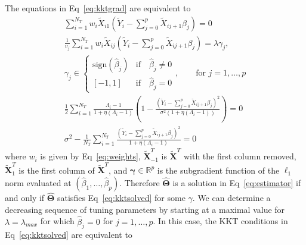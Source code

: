\documentclass[10pt,letterpaper]{article}
\newcommand{\tm}[1]{\textrm{{#1}}}
\newcommand{\bX}{\textbf{X}}
\newcommand{\bXtilde}{\widetilde{\bX}}
\newcommand{\Xtilde}{\widetilde{X}}
\newcommand{\Ytilde}{\widetilde{Y}}
\newcommand{\bTheta}{\boldsymbol{\Theta}}
\begin{document}
The equations in Eq~\ref{eq:kktgrad} are equivalent to
\begin{equation}
\begin{aligned}
\sum_{i=1}^{N_T}w_i \Xtilde_{i1}\left(  \Ytilde_i - \sum_{j=0}^{p}\Xtilde_{ij+1}\beta_j \right)  = 0\\
\frac{1}{v_j} \sum_{i=1}^{N_T}w_i \Xtilde_{ij}\left(  \Ytilde_i - \sum_{j=0}^{p}\Xtilde_{ij+1}\beta_j \right) =  \lambda \gamma_j, \\
\gamma_j \in \begin{cases}
\tm{sign}(\hat{\beta}_j) & \tm{if} \quad \hat{\beta}_j \neq 0 \\
[-1,1] & \tm{if}\quad \hat{\beta}_j = 0
\end{cases}, \qquad \tm{for }j=1, \ldots, p   \\
\frac{1}{2} \sum_{i=1}^{N_T} \frac{\Lambda_i - 1}{1 + \eta(\Lambda_i - 1)} \left(1- \frac{\left(  \Ytilde_i - \sum_{j=0}^{p}\Xtilde_{ij+1}\beta_j \right) ^2}{\sigma^2 (1+\eta(\Lambda_i-1))}  \right) = 0  \\
{\sigma^2} - \frac{1}{N_T}\sum_{i=1}^{N_T}\frac{\left(  \Ytilde_i - \sum_{j=0}^{p}\Xtilde_{ij+1}\beta_j \right) ^2}{1 + \eta (\Lambda_i-1)} = 0
\end{aligned}\label{eq:kktsolved}
\end{equation}
where $w_i$ is given by Eq~\ref{eq:weights}, $\bXtilde^T_{-1}$ is $\bXtilde^T$ with the first column removed, $\bXtilde^T_1$ is the first column of $\bXtilde^T$, and $\boldsymbol{\gamma} \in \mathbb{R}^p$ is the subgradient function of the $\ell_1$ norm evaluated at $(\hat{\beta}_1, \ldots, \hat{\beta}_p)$. Therefore $\widehat{\bTheta}$ is a solution in Eq~\ref{eq:estimator} if and only if $\widehat{\bTheta}$ satisfies Eq~\ref{eq:kktsolved} for some $\gamma$. %
We can determine a decreasing sequence of tuning parameters by starting at a maximal value for $\lambda = \lambda_{max}$ for which $\hat{\beta}_j = 0$ for $j=1, \ldots, p$. In this case, the KKT conditions in Eq~\ref{eq:kktsolved} are equivalent to
\end{document}
